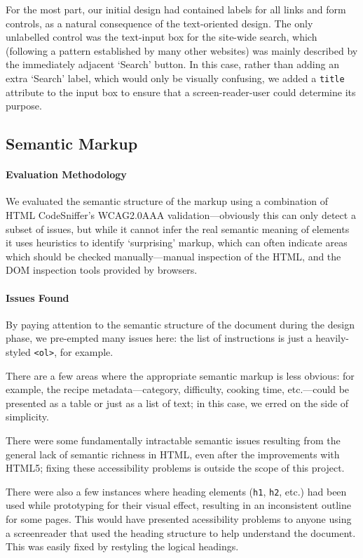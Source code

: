 For the most part, our initial design had contained labels for all
links and form controls, as a natural consequence of the text-oriented
design. The only unlabelled control was the text-input box for the
site-wide search, which (following a pattern established by many other
websites) was mainly described by the immediately adjacent `Search'
button. In this case, rather than adding an extra `Search' label,
which would only be visually confusing, we added a \verb!title!
attribute to the input box to ensure that a screen-reader-user could
determine its purpose.

\subsection{Semantic Markup}

\paragraph{Evaluation Methodology}
We evaluated the semantic structure of the markup using a combination
of HTML CodeSniffer's WCAG2.0AAA validation---obviously this can only
detect a subset of issues, but while it cannot infer the real semantic
meaning of elements it uses heuristics to identify `surprising'
markup, which can often indicate areas which should be checked
manually---manual inspection of the HTML, and the DOM inspection tools
provided by browsers.

\paragraph{Issues Found}
By paying attention to the semantic structure of the document during
the design phase, we pre-empted many issues here: the list of
instructions is just a heavily-styled \verb!<ol>!, for example.

There are a few areas where the appropriate semantic markup is less
obvious: for example, the recipe metadata---category, difficulty,
cooking time, etc.---could be presented as a table or just as a list
of text; in this case, we erred on the side of simplicity.

There were some fundamentally intractable semantic issues resulting
from the general lack of semantic richness in HTML, even after the
improvements with HTML5; fixing these accessibility problems is
outside the scope of this project.

There were also a few instances where heading elements (\verb!h1!,
\verb!h2!, etc.) had been used while prototyping for their visual
effect, resulting in an inconsistent outline for some pages. This
would have presented acessibility problems to anyone using a
screenreader that used the heading structure to help understand the
document. This was easily fixed by restyling the logical headings.

